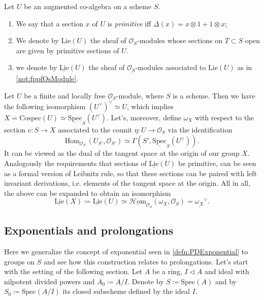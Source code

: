 \begin{defn}[]
	Let $U$ be an augmented co-algebra on a scheme $S$.
\begin{enumerate}
\item We say that a section $x$ of $U$ is {\em primitive} iff
	$\Delta(x) = x \otimes 1 + 1 \otimes x$;

\item We denote by $\mathrm{Lie}(U)$ the sheaf of $\mathcal{O}_{ S }$-modules
	whose sections on $T \subset S$ open are given by
	primitive sections of $U$.

\item we denote by $\underline{\mathrm{Lie}}(U)$ the sheaf of $\underline{\mathcal{O}_{ S }}$-modules
	associated to $\mathrm{Lie}(U)$ as in \cref{not:fppfOsModule}.
\end{enumerate}
\end{defn}


\begin{rem}\label{LieDualConormalSheaf}
	Let $U$ be a finite and locally free $\mathcal{O}_{ S }$-module,
	where $S$ is a scheme.
	Then we have the following isomorphism $(U^\vee)^\vee \simeq U$,
	which implies $X = \mathrm{Cospec}(U) \simeq 
	\underline{\mathrm{Spec}}_S(U^\vee)$.
	Let's, moreover, define $\omega_X$ with respect to the section $e\colon S \to X$
	associated to the counit $\eta\colon U \to \mathcal{O}_{ S }$
	via the identification
	\begin{equation*}
		\mathrm{Hom}_{ \mathcal{O}_{ S' }}
		\left( U_{S'}, \mathcal{O}_{ S' } \right) 
		\simeq
		\Gamma(S', \underline{\mathrm{Spec}}_S(U^\vee))
	.\end{equation*}
	It can be viewed as the dual of the tangent space at the origin
	of our group $X$.
	Analogously the requirements that sections of $\underline{\mathrm{Lie}}(U)$
	be primitive, can be seen as a formal version of Leibnitz rule,
	so that these sections can be paired with left invariant derivations, i.e.
	elements of the tangent space at the origin.
	All in all, the above can be expanded to obtain an isomorphism
	\begin{equation*}
		\underline{\mathrm{Lie}}(X) \coloneqq
		\underline{\mathrm{Lie}}(U) \simeq
		\underline{\mathcal{H}\mathrm{om}}_{ \mathcal{O}_{ S } } 
		\left(\omega_X , \mathcal{O}_{ S } \right) =
		\underline{\omega_X}^\vee
	.\end{equation*}
\end{rem}


\subsection{Exponentials and prolongations}
Here we generalize the concept of exponential seen in \cref{defn:PDExponential}
to groups on $S$ and see how this construction relates to prolongations.
Let's start with the setting of the following section.
Let $A$ be a ring, $I \triangleleft A$ and ideal with nilpotent
divided powers and $A_0 \coloneqq A/I$.
Denote by $S \coloneqq \mathrm{Spec}(A)$
and by $S_0 \coloneqq \mathrm{Spec}(A/I)$ its closed
subscheme defined by the ideal $I$.



